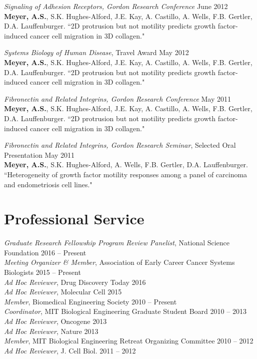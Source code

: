 \documentclass[11pt]{res}
\begin{document}
\begin{resume}
{\sl Signaling of Adhesion Receptors, Gordon Research Conference} \hfill June 2012 \\
{\bf Meyer, A.S.}, S.K. Hughes-Alford, J.E. Kay, A. Castillo, A. Wells, F.B. Gertler, D.A. Lauffenburger. ``2D protrusion but not motility predicts growth factor-induced cancer cell migration in 3D collagen."

{\sl Systems Biology of Human Disease}, Travel Award \hfill May 2012 \\
{\bf Meyer, A.S.}, S.K. Hughes-Alford, J.E. Kay, A. Castillo, A. Wells, F.B. Gertler, D.A. Lauffenburger. ``2D protrusion but not motility predicts growth factor-induced cancer cell migration in 3D collagen."

{\sl Fibronectin and Related Integrins, Gordon Research Conference} \hfill May 2011 \\
{\bf Meyer, A.S.}, S.K. Hughes-Alford, J.E. Kay, A. Castillo, A. Wells, F.B. Gertler, D.A. Lauffenburger. ``2D protrusion but not motility predicts growth factor-induced cancer cell migration in 3D collagen."

{\sl Fibronectin and Related Integrins, Gordon Research Seminar}, Selected Oral Presentation \hfill May 2011 \\
{\bf Meyer, A.S.}, S.K. Hughes-Alford, A. Wells, F.B. Gertler, D.A. Lauffenburger. ``Heterogeneity of growth factor motility responses among a panel of carcinoma and endometriosis cell lines."



\section{Professional Service}

\newcommand{\serveItem}[3]{{\sl #1}, #2 \hfill #3 \\}

\serveItem{Graduate Research Fellowship Program Review Panelist}{National Science Foundation}{2016 -- Present}
\serveItem{Meeting Organizer \& Member}{Association of Early Career Cancer Systems Biologists}{2015 -- Present}
\serveItem{Ad Hoc Reviewer}{Drug Discovery Today}{2016}
\serveItem{Ad Hoc Reviewer}{Molecular Cell}{2015}
\serveItem{Member}{Biomedical Engineering Society}{2010 -- Present}
\serveItem{Coordinator}{MIT Biological Engineering Graduate Student Board}{2010 -- 2013}
\serveItem{Ad Hoc Reviewer}{Oncogene}{2013}
\serveItem{Ad Hoc Reviewer}{Nature}{2013}
\serveItem{Member}{MIT Biological Engineering Retreat Organizing Committee}{2010 -- 2012}
\serveItem{Ad Hoc Reviewer}{J. Cell Biol.}{2011 -- 2012}


\end{resume}
\end{document}
